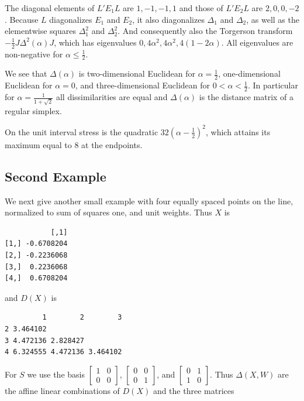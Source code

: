 \documentclass[
  12pt,
  letterpaper,
  DIV=11,
  numbers=noendperiod]{scrreprt}
\theoremstyle{remark}
\begin{document}
The diagonal elements of \(L'E_1L\) are \(1,-1,-1,1\) and those of
\(L'E_2 L\) are \(2,0,0,-2\). Because \(L\) diagonalizes \(E_1\) and
\(E_2\), it also diagonalizes \(\Delta_1\) and \(\Delta_2\), as well as
the elementwise squares \(\Delta^2_1\) and \(\Delta^2_2\). And
consequently also the Torgerson transform
\(-\frac12 J\Delta^2(\alpha)J\), which has eigenvalues
\(0,4\alpha^2,4\alpha^2,4(1-2\alpha)\). All eigenvalues are non-negative
for \(\alpha\leq\frac12\).

We see that \(\Delta(\alpha)\) is two-dimensional Euclidean for
\(\alpha=\frac12\), one-dimensional Euclidean for \(\alpha=0\), and
three-dimensional Euclidean for \(0<\alpha<\frac12\). In particular for
\(\alpha=\frac{1}{1+\sqrt{2}}\) all dissimilarities are equal and
\(\Delta(\alpha)\) is the distance matrix of a regular simplex.

On the unit interval stress is the quadratic \(32(\alpha-\frac12)^2\),
which attains its maximum equal to 8 at the endpoints.

\subsection{Second Example}\label{second-example}

We next give another small example with four equally spaced points on
the line, normalized to sum of squares one, and unit weights. Thus \(X\)
is

\begin{verbatim}
           [,1]
[1,] -0.6708204
[2,] -0.2236068
[3,]  0.2236068
[4,]  0.6708204
\end{verbatim}

and \(D(X)\) is

\begin{verbatim}
         1        2        3
2 3.464102                  
3 4.472136 2.828427         
4 6.324555 4.472136 3.464102
\end{verbatim}

For \(S\) we use the basis \(\begin{bmatrix}1&0\\0&0\end{bmatrix}\),
\(\begin{bmatrix}0&0\\0&1\end{bmatrix}\), and
\(\begin{bmatrix}0&1\\1&0\end{bmatrix}\). Thus \(\Delta(X,W)\) are the
affine linear combinations of \(D(X)\) and the three matrices
\end{document}
